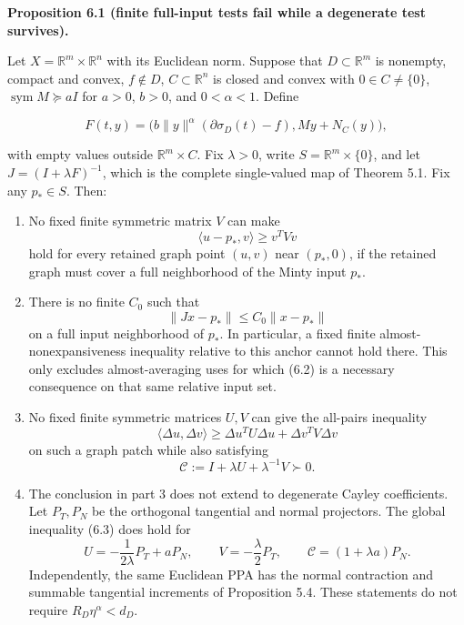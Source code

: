 \documentclass[11pt,a4paper]{article}
\theoremstyle{plain}
\theoremstyle{definition}
\theoremstyle{remark}
\begin{document}
\textbf{Proposition 6.1 (finite full-input tests fail while a degenerate
test survives).}

Let \(X=\mathbb R^m\times\mathbb R^n\) with its Euclidean norm. Suppose
that \(D\subset\mathbb R^m\) is nonempty, compact and convex,
\(f\notin D\), \(C\subset\mathbb R^n\) is closed and convex with
\(0\in C\ne\{0\}\), \(\operatorname{sym}M\succeq aI\) for \(a>0\),
\(b>0\), and \(0<\alpha<1\). Define

\[
F(t,y)=\bigl(b\|y\|^\alpha(\partial\sigma_D(t)-f),My+N_C(y)\bigr),
\]

with empty values outside \(\mathbb R^m\times C\). Fix \(\lambda>0\),
write \(S=\mathbb R^m\times\{0\}\), and let \(J=(I+\lambda F)^{-1}\),
which is the complete single-valued map of Theorem 5.1. Fix any
\(p_*\in S\). Then:

\begin{enumerate}
\def\labelenumi{\arabic{enumi}.}
\item
  No fixed finite symmetric matrix \(V\) can make \[
  \langle u-p_*,v\rangle\ge v^TVv
  \tag{6.1}
  \] hold for every retained graph point \((u,v)\) near \((p_*,0)\), if
  the retained graph must cover a full neighborhood of the Minty input
  \(p_*\).
\item
  There is no finite \(C_0\) such that \[
  \|Jx-p_*\|\le C_0\|x-p_*\|
  \tag{6.2}
  \] on a full input neighborhood of \(p_*\). In particular, a fixed
  finite almost-nonexpansiveness inequality relative to this anchor
  cannot hold there. This only excludes almost-averaging uses for which
  (6.2) is a necessary consequence on that same relative input set.
\item
  No fixed finite symmetric matrices \(U,V\) can give the all-pairs
  inequality \[
  \langle\Delta u,\Delta v\rangle
  \ge\Delta u^TU\Delta u+\Delta v^TV\Delta v
  \tag{6.3}
  \] on such a graph patch while also satisfying \[
  \mathcal C:=I+\lambda U+\lambda^{-1}V\succ0.
  \tag{6.4}
  \]
\item
  The conclusion in part 3 does not extend to degenerate Cayley
  coefficients. Let \(P_T,P_N\) be the orthogonal tangential and normal
  projectors. The global inequality (6.3) does hold for \[
  U=-\frac1{2\lambda}P_T+aP_N,
  \qquad V=-\frac\lambda2P_T,
  \qquad \mathcal C=(1+\lambda a)P_N.
  \tag{6.5}
  \] Independently, the same Euclidean PPA has the normal contraction
  and summable tangential increments of Proposition 5.4. These
  statements do not require \(R_D\eta^\alpha<d_D\).
\end{enumerate}
\end{document}

